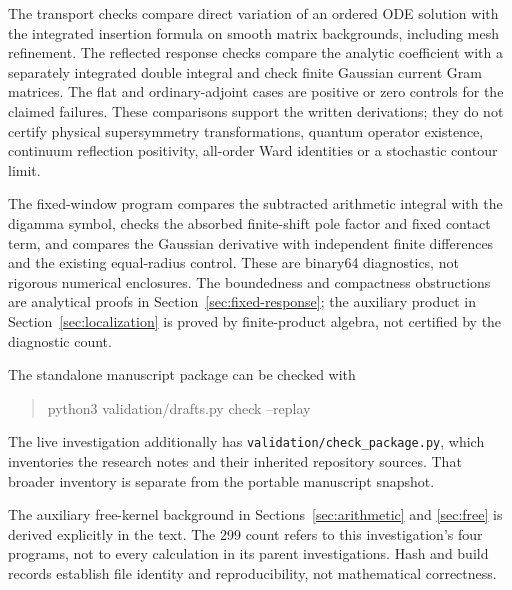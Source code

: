 The transport checks compare direct variation of an ordered ODE
solution with the integrated insertion formula on smooth matrix
backgrounds, including mesh refinement. The reflected response
checks compare the analytic coefficient with a separately integrated
double integral and check finite Gaussian current Gram matrices.
The flat and ordinary-adjoint cases are positive or zero controls
for the claimed failures. These comparisons support the written
derivations; they do not certify physical supersymmetry transformations,
quantum operator existence, continuum reflection positivity,
all-order Ward identities or a stochastic contour limit.

The fixed-window program compares the subtracted arithmetic integral
with the digamma symbol, checks the absorbed finite-shift pole factor
and fixed contact term, and compares the Gaussian derivative with
independent finite differences and the existing equal-radius control.
These are binary64 diagnostics, not rigorous numerical enclosures.
The boundedness and compactness obstructions are analytical proofs
in Section~\ref{sec:fixed-response}; the auxiliary product in
Section~\ref{sec:localization} is proved by finite-product algebra,
not certified by the diagnostic count.

The standalone manuscript package can be checked with
\begin{quote}\ttfamily\small
python3 validation/drafts.py check --replay
\end{quote}
The live investigation additionally has
\nolinkurl{validation/check_package.py}, which inventories the
research notes and their inherited repository sources. That broader
inventory is separate from the portable manuscript snapshot.

The auxiliary free-kernel background in Sections~\ref{sec:arithmetic}
and \ref{sec:free} is derived explicitly in the text. The 299 count
refers to this investigation's four programs, not to every calculation
in its parent investigations. Hash and build records establish file
identity and reproducibility, not mathematical correctness.
